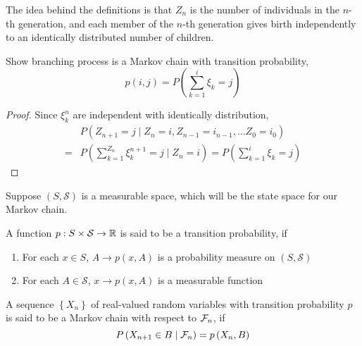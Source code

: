 \begin{remark}
	The idea behind the definitions is that $Z_{n}$ is the number of individuals in the $n$-th generation, and each member of the $n$-th generation gives birth independently to an identically distributed number of children.
\end{remark}

\begin{example}
	Show branching process is a Markov chain with transition probability,
	\begin{equation*}
		p(i,j)=P\left(\sum_{k=1}^{i}\xi_{k}=j\right)
	\end{equation*}
\end{example}

\begin{proof}
	Since $\xi_{k}^{n}$ are independent with identically distribution,
	\begin{equation*}
		\begin{aligned}
			  & P\left(Z_{n+1}=j\mid Z_{n}=i,Z_{n-1}=i_{n-1},\ldots Z_{0}=i_{0}\right)                            \\
			= & P\left(\sum_{k=1}^{Z_{n}}\xi_{k}^{n+1}=j\mid Z_{n}=i\right)=P\left(\sum_{k=1}^{i}\xi_{k}=j\right)
		\end{aligned}
	\end{equation*}
\end{proof}

Suppose $(S, \mathcal{S})$ is a measurable space, which will be the state space for our Markov chain.

\begin{definition}
	A function $p:S\times\mathcal{S}\rightarrow{\mathbb R}$ is said to be a transition probability, if
	\begin{enumerate}
		\item For each $x\in S$, $A\rightarrow p(x,A)$ is a probability measure on $(S,\mathcal{S})$
		\item For each $A\in\mathcal{S}$, $x\rightarrow p(x,A)$ is a measurable function
	\end{enumerate}
\end{definition}
\begin{definition}
	A sequence $\left\{X_{n}\right\}$ of real-valued random variables with transition probability $p$ is said to be a Markov chain with respect to ${\mathcal F}_{n}$, if
	\begin{equation}
		P\left(X_{n+1}\in B\mid{\mathcal F}_{n}\right)=p\left(X_{n},B\right)
	\end{equation}
\end{definition}

